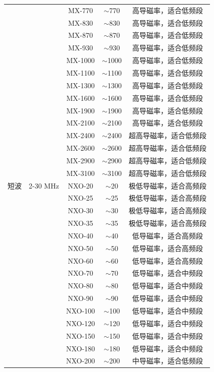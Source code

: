 \begin{center}
\begin{tabular}{|c|c|c|c|c|}
 & & MX-770 & $\sim$770 & 高导磁率，适合低频段 \\
 & & MX-830 & $\sim$830 & 高导磁率，适合低频段 \\
 & & MX-870 & $\sim$870 & 高导磁率，适合低频段 \\
 & & MX-930 & $\sim$930 & 高导磁率，适合低频段 \\
 & & MX-1000 & $\sim$1000 & 高导磁率，适合低频段 \\
 & & MX-1100 & $\sim$1100 & 高导磁率，适合低频段 \\
 & & MX-1300 & $\sim$1300 & 高导磁率，适合低频段 \\
 & & MX-1600 & $\sim$1600 & 高导磁率，适合低频段 \\
 & & MX-1900 & $\sim$1900 & 高导磁率，适合低频段 \\
 & & MX-2100 & $\sim$2100 & 高导磁率，适合低频段 \\
 & & MX-2400 & $\sim$2400 & 超高导磁率，适合低频段 \\
 & & MX-2600 & $\sim$2600 & 超高导磁率，适合低频段 \\
 & & MX-2900 & $\sim$2900 & 超高导磁率，适合低频段 \\
 & & MX-3100 & $\sim$3100 & 超高导磁率，适合低频段 \\
\hline
短波 & 2-30 MHz & NXO-20 & $\sim$20 & 极低导磁率，适合高频段 \\
 & & NXO-25 & $\sim$25 & 极低导磁率，适合高频段 \\
 & & NXO-30 & $\sim$30 & 极低导磁率，适合高频段 \\
 & & NXO-35 & $\sim$35 & 极低导磁率，适合高频段 \\
 & & NXO-40 & $\sim$40 & 低导磁率，适合高频段 \\
 & & NXO-50 & $\sim$50 & 低导磁率，适合高频段 \\
 & & NXO-60 & $\sim$60 & 低导磁率，适合高频段 \\
 & & NXO-70 & $\sim$70 & 低导磁率，适合中频段 \\
 & & NXO-80 & $\sim$80 & 低导磁率，适合中频段 \\
 & & NXO-90 & $\sim$90 & 低导磁率，适合中频段 \\
 & & NXO-100 & $\sim$100 & 低导磁率，适合中频段 \\
 & & NXO-120 & $\sim$120 & 低导磁率，适合中频段 \\
 & & NXO-150 & $\sim$150 & 低导磁率，适合中频段 \\
 & & NXO-180 & $\sim$180 & 低导磁率，适合中频段 \\
 & & NXO-200 & $\sim$200 & 中导磁率，适合低频段 \\

\end{tabular}
\end{center}
